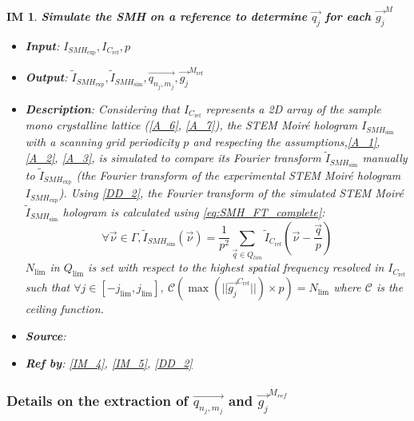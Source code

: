 \documentclass[12pt]{article}
\newtheorem{IM}{IM}
\begin{document}
\renewcommand{\labelitemi}{$-$}

\begin{IM}
\label{IM_1}
\noindent\colorbox{shadecolorIM}{\normalfont \textbf{Simulate the SMH on a reference to determine $\overrightarrow{q_{j}}$ for each $\overrightarrow{g_j}^{M}$}}
\normalfont
\begin{itemize}
\item \textbf{Input}: $I_{\mathit{SMH}_{\text{exp}}},I_{C_{\text{ref}}}, p$
\item \textbf{Output}: $\widetilde{I}_{\mathit{SMH}_{\text{exp}}}, \widetilde{I}_{\mathit{SMH}_{\text{sim}}}, \overrightarrow{q_{n_j,m_j}}, \overrightarrow{g_j}^{M_{\text{ref}}}$
\item \textbf{Description}: Considering that $I_{C_{\text{ref}}}$ represents a 2D array of the sample mono crystalline lattice (\cref{A_6}, \cref{A_7}), the STEM Moir{\'e} hologram $I_{\mathit{SMH}_{\text{sim}}}$ with a scanning grid periodicity $p$ and respecting the assumptions,\cref{A_1}, \cref{A_2}, \cref{A_3}, is simulated to compare its Fourier transform $\widetilde{I}_{\mathit{SMH}_{\text{sim}}}$ manually to $\widetilde{I}_{\mathit{SMH}_{\text{exp}}}$ (the Fourier transform of the experimental STEM Moir{\'e} hologram $I_{\mathit{SMH}_{\text{exp}}}$). Using \cref{DD_2}, the Fourier transform of the simulated STEM Moir{\'e} $\widetilde{I}_{\mathit{SMH}_{\text{sim}}}$ hologram is calculated using \cref{eq:SMH_FT_complete}:
\begin{equation}
\forall \vec{\nu} \in \Gamma, \widetilde{I}_{\mathit{SMH}_{\text{sim}}}(\vec{\nu})=\frac{1}{p^2}\sum_{\vec{q}\in Q_{lim}}\widetilde{I}_{C_{\text{ref}}}(\vec{\nu}-\frac{\vec{q}}{p})
\end{equation}
$N_{\text{lim}}$ in $Q_{\text{lim}}$ is set with respect to the highest spatial frequency resolved in  $I_{C_{\text{ref}}}$ such that $\forall j \in [-j_{\text{lim}},j_{\text{lim}}], \ \mathcal{C}(\max(||\overrightarrow{g_j}^{C_{\text{ref}}}||)\times p) = N_{\text{lim}}$ where $\mathcal{C}$ is the ceiling function.
\item \textbf{Source}: \cite{Pofelski2017}
\item \textbf{Ref by}: \cref{IM_4}, \cref{IM_5}, \cref{DD_2}
\end{itemize}
\end{IM}

\subsubsection*{Details on the extraction of $\overrightarrow{q_{n_j,m_j}}$ and $ \overrightarrow{g_j}^{M_{ref}}$}
\end{document}

